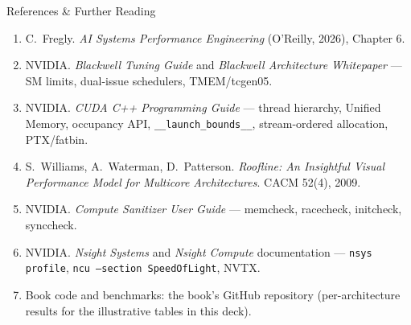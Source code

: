 \documentclass[aspectratio=169]{beamer}
\begin{document}
\begin{frame}{References \& Further Reading}
  {\footnotesize
  \begin{enumerate}
    \item C.\ Fregly. \emph{AI Systems Performance Engineering} (O'Reilly, 2026), Chapter 6.
    \item NVIDIA. \emph{Blackwell Tuning Guide} and \emph{Blackwell Architecture Whitepaper} ---
          SM limits, dual-issue schedulers, TMEM/tcgen05.
    \item NVIDIA. \emph{CUDA C++ Programming Guide} --- thread hierarchy, Unified Memory,
          occupancy API, \texttt{\_\_launch\_bounds\_\_}, stream-ordered allocation, PTX/fatbin.
    \item S.\ Williams, A.\ Waterman, D.\ Patterson. \emph{Roofline: An Insightful Visual Performance
          Model for Multicore Architectures}. CACM 52(4), 2009.
    \item NVIDIA. \emph{Compute Sanitizer User Guide} --- memcheck, racecheck, initcheck, synccheck.
    \item NVIDIA. \emph{Nsight Systems} and \emph{Nsight Compute} documentation ---
          \texttt{nsys profile}, \texttt{ncu --section SpeedOfLight}, NVTX.
    \item Book code and benchmarks: the book's GitHub repository (per-architecture results for the
          illustrative tables in this deck).
  \end{enumerate}}
\end{frame}
\end{document}
